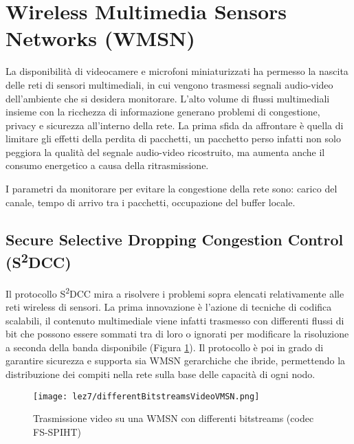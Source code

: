 \section{Wireless Multimedia Sensors Networks (WMSN)}

	La disponibilità di videocamere e microfoni miniaturizzati ha permesso la nascita delle reti di sensori multimediali, in cui vengono trasmessi segnali audio-video dell'ambiente che si desidera monitorare.
	L'alto volume di flussi multimediali insieme con la ricchezza di informazione generano problemi di congestione, privacy e sicurezza all'interno della rete.
	La prima sfida da affrontare è quella di limitare gli effetti della perdita di pacchetti, un pacchetto perso infatti non solo peggiora la qualità del segnale audio-video ricostruito, ma aumenta anche il consumo energetico a causa della ritrasmissione.
	
	I parametri da monitorare per evitare la congestione della rete sono: carico del canale, tempo di arrivo tra i pacchetti, occupazione del buffer locale.
	
	
\subsection{Secure Selective Dropping Congestion Control (S\textsuperscript{2}DCC)}

	Il protocollo S\textsuperscript{2}DCC mira a risolvere i problemi sopra elencati relativamente alle reti wireless di sensori.
	La prima innovazione è l'azione di tecniche di codifica scalabili, il contenuto multimediale viene infatti trasmesso con differenti flussi  di bit che possono essere sommati tra di loro o ignorati per modificare la risoluzione a seconda della banda disponibile (Figura \ref{fig:WMSN-trasmissioneBitstreams}).
	Il protocollo è poi in grado di garantire sicurezza e supporta sia WMSN gerarchiche che ibride, permettendo la distribuzione dei compiti nella rete sulla base delle capacità di ogni nodo.
	
	\begin{figure}[h]
		\centering
		\texttt{[image: lez7/differentBitstreamsVideoVMSN.png]}
		\caption{Trasmissione video su una WMSN con differenti bitstreams (codec FS-SPIHT)}
		\label{fig:WMSN-trasmissioneBitstreams}
	\end{figure}
